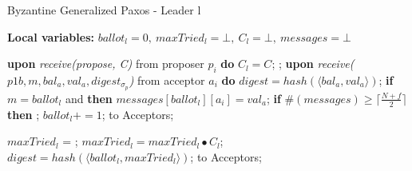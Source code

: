 \begin{algorithm}
	\caption{Byzantine Generalized Paxos - Leader l}
	\textbf{Local variables:} $ballot_l = 0,\ maxTried_l = \bot,\ C_l = \bot,\ messages = \bot$
	\begin{algorithmic}[1]
		\State \textbf{upon} \textit{receive(propose, C)} from proposer $p_i$ \textbf{do} 
		\State \hspace{\algorithmicindent} $C_l = C$;
		\State \hspace{\algorithmicindent} ;
		\State
		\State \textbf{upon} \textit{receive($p1b, m, bal_a, val_a, digest_{\sigma_p}$)} from acceptor $a_i$ \textbf{do}
		\State \hspace{\algorithmicindent} $digest = hash(\langle bal_a, val_a \rangle)$;
		\State \hspace{\algorithmicindent} \textbf{if} $m = ballot_l$ and  \textbf{then}
		\State \hspace{\algorithmicindent}\hspace{\algorithmicindent}\hspace{\algorithmicindent}  $messages[ballot_l][a_i] = val_a$;
		\State \hspace{\algorithmicindent} \textbf{if} $\#(messages) \geq \lceil \frac{N+f}{2}\rceil$ \textbf{then} 
		\State \hspace{\algorithmicindent}\hspace{\algorithmicindent} ;
		\State
		\State $ballot_l \mathrel{+{=}} 1$;
		\State {} to Acceptors;
		\EndFunction
		
		\State
		\State $maxTried_l$ = ;
		\State $maxTried_l = maxTried_l \bullet C_l$;
		\State $digest = hash(\langle ballot_l, maxTried_l \rangle)$;
		\State {} to Acceptors;
		\EndFunction
		

\end{algorithmic}
\end{algorithm}
